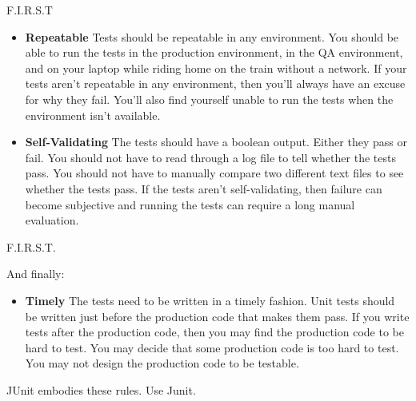 \documentclass{beamer}
\begin{document}
\begin{frame}[fragile]{F.I.R.S.T}


\begin{itemize}

\item {\bf Repeatable} Tests should be repeatable in any environment. You should be able to run the tests in the production environment, in the QA environment, and on your laptop while riding home on the train without a network. If your tests aren't repeatable in any environment, then you'll always have an excuse for why they fail. You'll also find yourself unable to run the tests when the environment isn't available.

\item {\bf Self-Validating} The tests should have a boolean output. Either they pass or fail. You should not have to read through a log file to tell whether the tests pass. You should not have to manually compare two different text files to see whether the tests pass. If the tests aren't self-validating, then failure can become subjective and running the tests can require a long manual evaluation.

\end{itemize}


\end{frame}

\begin{frame}[fragile]{F.I.R.S.T.}


And finally:

\begin{itemize}
\item {\bf Timely} The tests need to be written in a timely fashion. Unit tests should be written just before the production code that makes them pass. If you write tests after the production code, then you may find the production code to be hard to test. You may decide that some production code is too hard to test. You may not design the production code to be testable.
\end{itemize}

JUnit embodies these rules.  Use Junit.

\end{frame}







\end{document}
